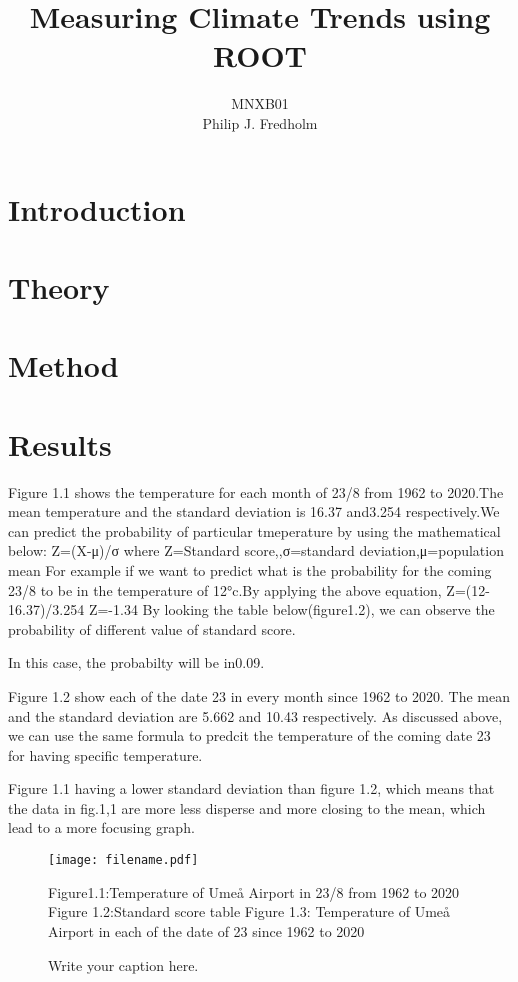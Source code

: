 \documentclass[a4, 12pt]{article}
\title{Measuring Climate Trends using ROOT}
\author{MNXB01 \\ Philip J. Fredholm \\ }
\begin{document}
\maketitle
\tableofcontents
\newpage

\section{Introduction}
\section{Theory}
\section{Method}
\section{Results}
Figure 1.1 shows the temperature for each month of 23/8 from 1962 to 2020.The mean temperature and the standard deviation is 16.37 and3.254 respectively.We can predict the probability of particular tmeperature by using the mathematical below:
Z=(X-μ)/σ where Z=Standard score,,σ=standard deviation,μ=population mean
For example if we want to predict what is the probability for the coming 23/8 to be in the temperature of 12°c.By applying the above equation,
Z=(12-16.37)/3.254
Z=-1.34
By looking the table below(figure1.2), we can observe the probability of different value of standard score.

In this case, the probabilty will be in0.09.

Figure 1.2 show each of the date 23 in every month since 1962 to 2020. The mean and the standard deviation are 5.662 and 10.43 respectively.
As discussed above, we can use the same formula to predcit the temperature of the coming date 23 for having specific temperature.

Figure 1.1 having a lower standard deviation than figure 1.2, which means that the data in fig.1,1 are more less disperse and more closing to the mean, which lead to a more focusing graph.


\begin{figure}
\centering
\texttt{[image: filename.pdf]}
\caption{Write your caption here.}
Figure1.1:Temperature of Umeå Airport in 23/8 from 1962 to 2020
Figure 1.2:Standard score table
Figure 1.3: Temperature of Umeå Airport in each of the date of 23 since 1962 to 2020
\end{figure}
\end{document}
